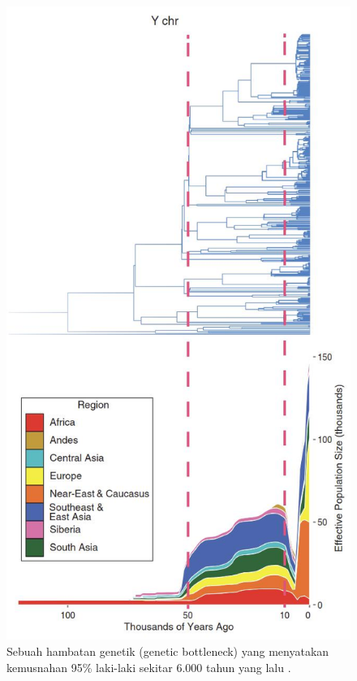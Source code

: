 \documentclass[10pt,twocolumn,letterpaper]{article}
\begin{document}
\begin{figure}[t]
\begin{center}
   \includegraphics[width=1\linewidth]{bottleneck.jpg}
\end{center}
   \caption{Sebuah hambatan genetik (genetic bottleneck) yang menyatakan kemusnahan 95\% laki-laki sekitar 6.000 tahun yang lalu \cite{62}.}
\label{fig:10}
\label{fig:onecol}
\end{figure}
\end{document}
